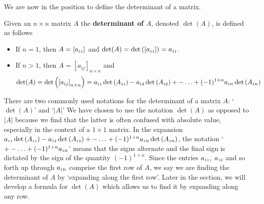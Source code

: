 We are now in the position to define the determinant of a matrix.

\smallskip

\colorbox{ResultColor}{\bbm

\begin{defn} \label{determinantdefn}   Given an $n \times n$ matrix $A$ the \textbf{determinant of \boldmath $A$}, denoted $\det(A)$, is defined as follows

\begin{itemize}

\item  If $n=1$, then $A = \left[ a_{\mbox{\tiny$11$}} \right]$ and $\det(A) = \det\left( \left[ a_{\mbox{\tiny$11$}} \right] \right) = a_{\mbox{\tiny$11$}}$.

\item  If $n>1$, then $A = \left[ a_{ij} \right]_{n \times n}$ and \[ \det(A) = \det\left( \left[ a_{ij} \right]_{n \times n} \right) =  a_{\mbox{\tiny$11$}} \det\left(A_{\mbox{\tiny$11$}}\right)- a_{\mbox{\tiny$12$}} \det\left(A_{\mbox{\tiny$12$}}\right) + -  \ldots  + (-1)^{1+n} a_{\mbox{\tiny$1$}n} \det\left(A_{\mbox{\tiny$1$}n}\right)\]

\end{itemize}

\end{defn}
\ebm}

\smallskip

There are two commonly used notations for the determinant of a matrix $A$: `$\det(A)$' and `$|A|$'
We have chosen to use the notation $\det(A)$ as opposed to $|A|$ because we find that the latter is often confused with absolute value, especially in the context of a $1 \times 1$ matrix.  In the expansion $a_{\mbox{\tiny$11$}} \det\left(A_{\mbox{\tiny$11$}}\right)- a_{\mbox{\tiny$12$}} \det\left(A_{\mbox{\tiny$12$}}\right) + -  \ldots  + (-1)^{1+n} a_{\mbox{\tiny$1$}n} \det\left(A_{\mbox{\tiny$1$}n}\right)$, the notation `$+ -  \ldots  + (-1)^{1+n} a_{\mbox{\tiny$1$}n}$' means that the signs alternate and the final sign is dictated by the sign of the quantity $(-1)^{1+n}$. Since the entries $a_{\mbox{\tiny$11$}}$, $a_{\mbox{\tiny$12$}}$ and so forth up through $a_{\mbox{\tiny$1$}n}$ comprise the first row of $A$, we say we are finding the determinant of $A$  by `expanding along the first row'. Later in the section, we will develop a formula for $\det(A)$ which allows us to find it by expanding along any row.

